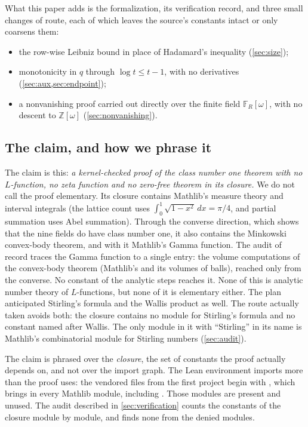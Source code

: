 \documentclass[11pt]{article}
\theoremstyle{definition}
\newcommand{\Z}{\mathbb{Z}}
\begin{document}
What this paper adds is the formalization, its verification record, and three small changes of route, each of which leaves the source's constants intact or only coarsens them:
\begin{itemize}[nosep]
\item the row-wise Leibniz bound in place of Hadamard's inequality (\cref{sec:size});
\item monotonicity in $q$ through $\log t \le t - 1$, with no derivatives (\cref{sec:aux,sec:endpoint});
\item a nonvanishing proof carried out directly over the finite field $\mathbb F_R[\omega]$, with no descent to $\Z[\omega]$ (\cref{sec:nonvanishing}).
\end{itemize}

\subsection{The claim, and how we phrase it}\label{sec:framing}

The claim is this: \emph{a kernel-checked proof of the class number one theorem with no $L$-function, no zeta function and no zero-free theorem in its closure.} We do not call the proof elementary. Its closure contains Mathlib's measure theory and interval integrals (the lattice count uses $\int_0^1 \sqrt{1-x^2}\,dx = \pi/4$, and partial summation uses Abel summation). Through the converse direction, which shows that the nine fields do have class number one, it also contains the Minkowski convex-body theorem, and with it Mathlib's Gamma function. The audit of record traces the Gamma function to a single entry: the volume computations of the convex-body theorem (Mathlib's  and its volumes of balls), reached only from the converse. No constant of the analytic steps reaches it. None of this is analytic number theory of $L$-functions, but none of it is elementary either. The plan anticipated Stirling's formula and the Wallis product as well. The route actually taken avoids both: the closure contains no module for Stirling's formula and no constant named after Wallis. The only module in it with ``Stirling'' in its name is Mathlib's combinatorial module for Stirling numbers (\cref{sec:audit}).

The claim is phrased over the \emph{closure}, the set of constants the proof actually depends on, and not over the import graph. The Lean environment imports more than the proof uses: the vendored files from the first project begin with , which brings in every Mathlib module, including . Those modules are present and unused. The audit described in \cref{sec:verification} counts the constants of the closure module by module, and finds none from the denied modules.
\end{document}

